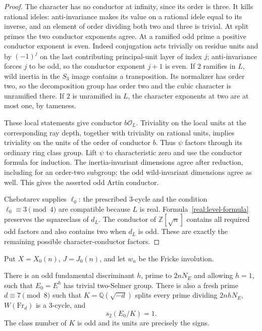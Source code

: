 \begin{proof}
The character has no conductor at infinity, since its order is three.
It kills rational ideles: anti-invariance makes its value on a rational
idele equal to its inverse, and an element of order dividing both two
and three is trivial. At split primes the two conductor exponents
agree. At a ramified odd prime a positive conductor exponent is even.
Indeed conjugation acts trivially on residue units and by \((-1)^j\)
on the last contributing principal-unit layer of index \(j\);
anti-invariance forces \(j\) to be odd, so the conductor exponent
\(j+1\) is even. If \(2\) ramifies in \(L\), wild inertia in the
\(S_3\) image contains a transposition. Its normalizer has order two,
so the decomposition group has order two and the cubic character is
unramified there. If \(2\) is unramified in \(L\), the character
exponents at two are at most one, by tameness.

These local statements give conductor \(b\mathcal O_L\). Triviality
on the local units at the corresponding ray depth, together with
triviality on rational units, implies triviality on the units of the
order of conductor \(b\). Thus \(\psi\) factors through its ordinary
ring class group. Lift \(\psi\) to characteristic zero and use the
conductor formula for induction. The inertia-invariant dimensions
agree after reduction, including for an order-two subgroup; the odd
wild-invariant dimensions agree as well. This gives the asserted odd
Artin conductor.

Chebotarev supplies \(\ell_0\): the prescribed \(3\)-cycle and the
condition \(\ell_0\equiv3\pmod4\) are compatible because \(L\) is
real. Formula~\eqref{real:level-formula} preserves the squareclass of
\(d_L\). The conductor of \(\mathbb Z[\sqrt n]\) contains all required
odd factors and also contains two when \(d_L\) is odd. These are
exactly the remaining possible character-conductor factors.
\end{proof}

Put \(X=X_0(n)\), \(J=J_0(n)\), and let \(w_n\) be the Fricke
involution.

\begin{lemma}\label{real:selmer-pair}
There is an odd fundamental discriminant \(h\), prime to \(2nN_E\)
and allowing \(h=1\), such that \(E_0=E^h\) has trivial two-Selmer
group. There is also a fresh prime \(d\equiv7\pmod8\) such that
\(K=\mathbb Q(\sqrt{-d})\) splits every prime dividing \(2nhN_E\),
\(W(\mathrm{Fr}_d)\) is a \(3\)-cycle, and
\[
 s_2(E_0/K)=1.
\]
The class number of \(K\) is odd and its units are precisely the signs.
\end{lemma}

